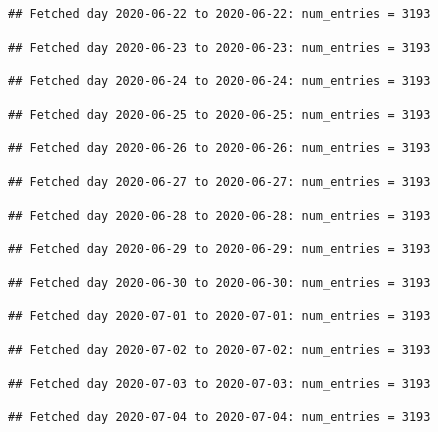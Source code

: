 \documentclass[]{article}
\begin{document}
\begin{verbatim}
## Fetched day 2020-06-22 to 2020-06-22: num_entries = 3193
\end{verbatim}

\begin{verbatim}
## Fetched day 2020-06-23 to 2020-06-23: num_entries = 3193
\end{verbatim}

\begin{verbatim}
## Fetched day 2020-06-24 to 2020-06-24: num_entries = 3193
\end{verbatim}

\begin{verbatim}
## Fetched day 2020-06-25 to 2020-06-25: num_entries = 3193
\end{verbatim}

\begin{verbatim}
## Fetched day 2020-06-26 to 2020-06-26: num_entries = 3193
\end{verbatim}

\begin{verbatim}
## Fetched day 2020-06-27 to 2020-06-27: num_entries = 3193
\end{verbatim}

\begin{verbatim}
## Fetched day 2020-06-28 to 2020-06-28: num_entries = 3193
\end{verbatim}

\begin{verbatim}
## Fetched day 2020-06-29 to 2020-06-29: num_entries = 3193
\end{verbatim}

\begin{verbatim}
## Fetched day 2020-06-30 to 2020-06-30: num_entries = 3193
\end{verbatim}

\begin{verbatim}
## Fetched day 2020-07-01 to 2020-07-01: num_entries = 3193
\end{verbatim}

\begin{verbatim}
## Fetched day 2020-07-02 to 2020-07-02: num_entries = 3193
\end{verbatim}

\begin{verbatim}
## Fetched day 2020-07-03 to 2020-07-03: num_entries = 3193
\end{verbatim}

\begin{verbatim}
## Fetched day 2020-07-04 to 2020-07-04: num_entries = 3193
\end{verbatim}
\end{document}
